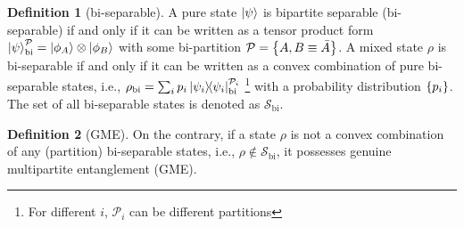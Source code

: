\documentclass[
aps,
pra,
twocolumn,
floatfix,
]{revtex4-2}
\theoremstyle{plain}
\theoremstyle{definition}
\newtheorem{definition}{Definition}
\newcommand{\dm}{\rho}
\newcommand{\bi}{\text{bi}}
\newcommand{\separable}{\mathcal{S}}
\newcommand{\ppartition}{\mathcal{P}}
\begin{document}
\begin{definition}[bi-separable]\label{def:bipartite_separable}
	A pure state $\ket{\psi}$ is bipartite separable (bi-separable) if and only if it can be written as a tensor product form 
	$\ket{\psi}_{\bi}^{\ppartition} = \ket{\phi_{A}}\otimes\ket{\phi_{B}}$ with some bi-partition $\ppartition=\qty{A,B\equiv \bar{A}}$. 
	A mixed state $\dm$ is bi-separable if and only if it can be written as a convex combination of pure bi-separable states, i.e.,
	$\dm_{\bi}=\sum_i p_i \op{\psi_i}_\bi^{\ppartition_i}$ 
	\footnote{For different $i$, $\ppartition_i$ can be different partitions}
	with a probability distribution $\qty{p_i}$.
	The set of all bi-separable states is denoted as $\separable_\bi$.
\end{definition}
\begin{definition}[GME]\label{def:gme}
	On the contrary, if a state $\dm$ is not a convex combination of any (partition) bi-separable states,
	i.e., $\dm\notin \separable_\bi$,
	it possesses genuine multipartite entanglement (GME).
\end{definition}
\end{document}
